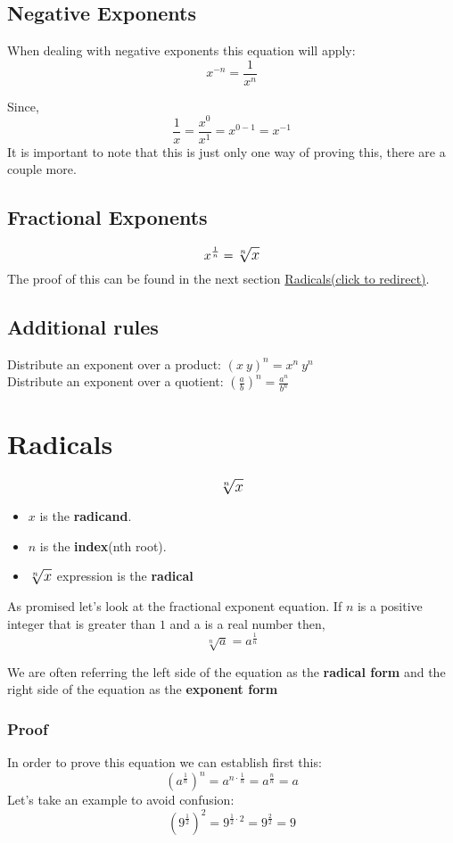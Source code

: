 \documentclass[a4paper,12pt]{book}
\begin{document}
\subsection{Negative Exponents}
When dealing with negative exponents this equation will apply: 
$$ x^{-n} = \frac{1}{x^n} $$

Since, 
$$ \frac{1}{x} = \frac{x^0}{x^1} = x^{0-1} = x^{-1} $$
It is important to note that this is just only one way of proving this, there are a couple more. 

\subsection{Fractional Exponents}
$$ \large x^{\frac{1}{n}} = \sqrt[n]{x} $$
The proof of this can be found in the next section \hyperref[sec:radicals]{Radicals(click to redirect)}.

\subsection{Additional rules}
Distribute an exponent over a product: $(x \ y)^{n} = x^{n} \ y^{n}$ \\
Distribute an exponent over a quotient: $  (\frac{a}{b})^{n} = \frac{a^{n}}{b^{n}}$

\newpage
\label{sec:radicals}
\section{Radicals}
$$ \large \sqrt[n]{x} $$
\begin{itemize}
  \item $x$ is the \textbf{radicand}.
  \item $n$ is the \textbf{index}(nth root).
  \item $\large \sqrt[n]{x}$ expression is the \textbf{radical}
\end{itemize}

As promised let's look at the fractional exponent equation. If $n$ is a positive integer that is greater than $1$ and a is a real number then,
$$ \sqrt[n]{a} = a^{\frac{1}{n}} $$

We are often referring the left side of the equation as the \textbf{radical form} and the right side of the equation as the \textbf{exponent form}

\subsubsection{Proof}
In order to prove this equation we can establish first this: 
$$ (a^{\frac{1}{n}})^{n} = a^{n \cdot \frac{1}{n}} = a^{\frac{n}{n}} = a $$
Let's take an example to avoid confusion: 
$$ (9^{\frac{1}{2}})^2 = 9^{\frac{1}{2} \cdot2} = 9^{\frac{2}{2}} = 9 $$
\end{document}
